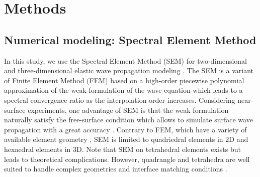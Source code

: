\documentclass[manuscript,revised]{geophysics}
\begin{document}
\section{Methods}

\subsection{Numerical modeling: Spectral Element Method}


\noindent In this study, we use the Spectral Element Method (SEM) for two-dimensional and three-dimensional elastic wave propagation modeling \citep{Komatitsch_SEM_1998,Komatitsch_ISM_1999,Komatitsch_SEM_2005,Festa_PML_2005}. The SEM is a variant of Finite Element Method (FEM) \citep{Lysmer_FEM_1972,Seron_FEM_1990,Hulbert_FEM_1990,Tromp_SEM_2008} based on a high-order piecewise polynomial approximation of the weak formulation of the wave equation which leads to a spectral convergence ratio as the interpolation order increases. Considering near-surface experiments, one advantage of SEM is that the weak formulation naturally satisfy the free-surface condition which allows to simulate surface wave propagation with a great accuracy \citep{komatitsch1998spectral,komatitsch1999spectral,Komatitsch_SEM_2005}. Contrary to FEM, which have a variety of available element geometry \citep{dhatt1984finite}, SEM is limited to quadriedral elements in 2D and hexaedral elements in 3D. Note that SEM on tetrahedral elements exists \citep{komatitsch2001wave} but leads to theoretical complications. However, quadrangle and tetrahedra are well suited to handle complex geometries and interface matching conditions \citep{Cristini_SEM_2012}. 
\end{document}
